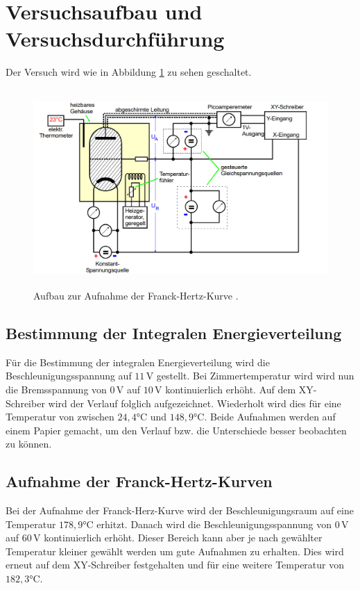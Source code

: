 \section{Versuchsaufbau und Versuchsdurchführung}

\begin{flushleft}
    Der Versuch wird wie in Abbildung \ref{Abbildung3} zu sehen geschaltet.
\end{flushleft}

\begin{figure}[H]
    \centering
    \includegraphics[height=75mm]{bilder/Ab3.png}
    \caption{Aufbau zur Aufnahme der Franck-Hertz-Kurve \cite{a1}. \label{Abbildung3} }
\end{figure}

\subsection{Bestimmung der Integralen Energieverteilung}

\begin{flushleft}
    Für die Bestimmung der integralen Energieverteilung wird die Beschleunigungsspannung auf $11\,\unit{\volt}$ gestellt.
    Bei Zimmertemperatur wird wird nun die Bremsspannung von $0\,\unit{\volt}$ auf $10\,\unit{\volt}$ kontinuierlich erhöht.
    Auf dem XY-Schreiber wird der Verlauf folglich aufgezeichnet.
    Wiederholt wird dies für eine Temperatur von zwischen $24,4\unit{\celsius}$ und $148,9\unit{\celsius}$.
    Beide Aufnahmen werden auf einem Papier gemacht, um den Verlauf bzw. die Unterschiede besser beobachten zu können.
\end{flushleft}

\subsection{Aufnahme der Franck-Hertz-Kurven}

\begin{flushleft}
Bei der Aufnahme der Franck-Herz-Kurve wird der Beschleunigungsraum auf eine Temperatur $178,9\unit{\celsius}$  erhitzt.
Danach wird die Beschleunigungsspannung von $0\,\unit{\volt}$ auf $60\,\unit{\volt}$ kontinuierlich erhöht.
Dieser Bereich kann aber je nach gewählter Temperatur kleiner gewählt werden um gute Aufnahmen zu erhalten.
Dies wird erneut auf dem XY-Schreiber festgehalten und für eine weitere Temperatur von $182,3\unit{\celsius}$.
\end{flushleft}